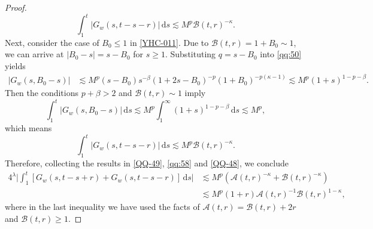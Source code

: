 \documentclass[11pt,twoside]{article}
\newcommand{\Acal}{\mathcal A}
\newcommand{\Bcal}{\mathcal B}
\newcommand{\dd}{\,\mathrm{d}}
\theoremstyle{plain}
\theoremstyle{definition}
\theoremstyle{remark}
\numberwithin{equation}{section}
\begin{document}
\begin{proof}
\begin{equation}
\label{qq:58}
\int_1^t
|G_w(s,t-s-r)|\dd s
\lesssim
M^p\Bcal(t,r)^{-\kappa}.
\end{equation}
Next, consider the case of $B_0\leq1$ in \eqref{YHC-011}. Due to
$\Bcal(t,r)=1+B_0\sim1$,
we can arrive at $|B_0-s|=s-B_0$ for $s\geq1$. Substituting
$q=s-B_0$ into \eqref{qq:50} yields
\[
\begin{aligned}
|G_w(s,B_0-s)|
&\lesssim
M^p(s-B_0)s^{-\beta}
(1+2s-B_0)^{-p}
(1+B_0)^{-p(\kappa-1)}\lesssim
M^p(1+s)^{1-p-\beta}.
\end{aligned}
\]
Then the conditions $p+\beta>2$ and $\Bcal(t,r)\sim1$ imply
\[
\int_1^t
|G_w(s,B_0-s)|\dd s
\lesssim
M^p\int_1^\infty
(1+s)^{1-p-\beta}\dd s
\lesssim
M^p,
\]
which means
\begin{equation}\label{QQ-48}
\int_1^t
|G_w(s,t-s-r)|\dd s
\lesssim
M^p\Bcal(t,r)^{-\kappa}.
\end{equation}
Therefore, collecting the results in \eqref{QQ-49}, \eqref{qq:58} and  \eqref{QQ-48}, we conclude
\begin{equation}\label{QQ-50}
\begin{aligned}
4^\lambda \big|
\int_1^t
\left[
G_w(s,t-s+r)
+G_w(s,t-s-r)
\right]\dd s \big| 
&\lesssim
M^p
\left(
\Acal(t,r)^{-\kappa}
+\Bcal(t,r)^{-\kappa}
\right)\\
&\lesssim
M^p(1+r)
\Acal(t,r)^{-1}
\Bcal(t,r)^{1-\kappa},
\end{aligned}
\end{equation}
where in the last inequality we have used the facts of
$\Acal(t,r)=\Bcal(t,r)+2r$ and $\Bcal(t,r)\geq1$.




\end{proof}
\end{document}
